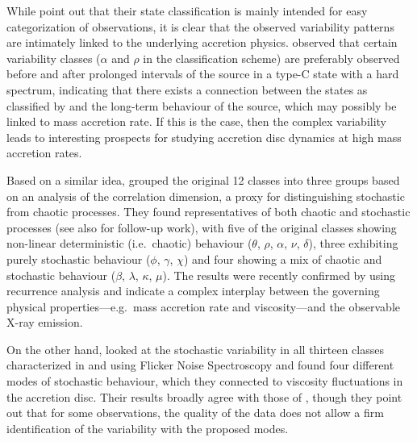 \documentclass[12pt]{emulateapj}
\begin{document}
While \citet{belloni2000} point out that their state classification is mainly intended for easy categorization of observations, it is clear that the observed variability patterns are intimately linked to the underlying accretion physics. \citet{naik2002} observed that certain variability classes ($\alpha$ and $\rho$ in the \citealt{belloni2000} classification scheme) are preferably observed before and after prolonged intervals of the source in a type-C state with a hard spectrum, indicating that there exists a connection between the states as classified by \citet{belloni2000} and the long-term behaviour of the source, which may possibly be linked to mass accretion rate. If this is the case, then the complex variability leads to interesting prospects for studying accretion disc dynamics at high mass accretion rates. 

Based on a similar idea, \citet{misra2004, misra2006} grouped the original 12 classes into three groups based on an analysis of the correlation dimension, a proxy for distinguishing stochastic from chaotic processes. They found representatives of both chaotic and stochastic processes (see also \citealt{harikrishnan2011} for follow-up work), with five of the original classes showing non-linear deterministic (i.e.\ chaotic) behaviour ($\theta$, $\rho$, $\alpha$, $\nu$, $\delta$), three exhibiting purely stochastic behaviour ($\phi$, $\gamma$, $\chi$) and four showing a mix of chaotic and stochastic behaviour ($\beta$, $\lambda$, $\kappa$, $\mu$). The results were recently confirmed by \citet{sukova2016} using recurrence analysis and indicate a complex interplay between the governing physical properties---e.g.\ mass accretion rate and viscosity---and the observable X-ray emission.

On the other hand, \citet{polyakov2012} looked at the stochastic variability in all thirteen classes characterized in \citet{belloni2000} and \citet{kleinwolt2002} using Flicker Noise Spectroscopy and found four different modes of stochastic behaviour, which they connected to viscosity fluctuations in the accretion disc. Their results broadly agree with those of \citet{misra2006}, though they point out that for some observations, the quality of the data does not allow a firm identification of the variability with the proposed modes.
\end{document}
